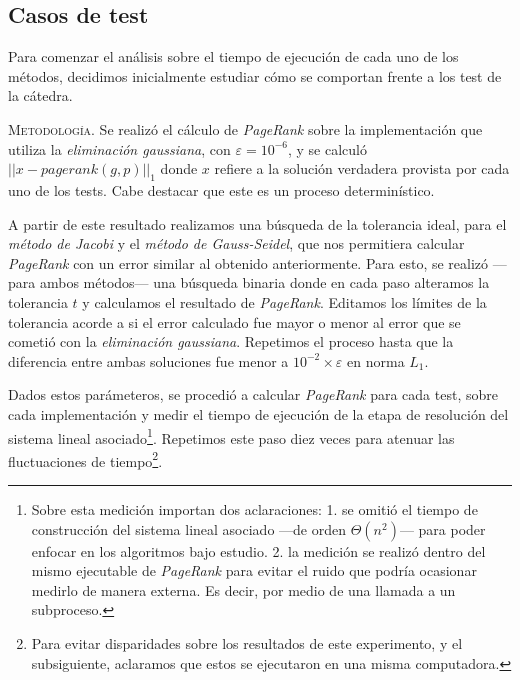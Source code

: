 \subsection{Casos de test}

Para comenzar el análisis sobre el tiempo de ejecución de cada uno de los métodos, decidimos inicialmente estudiar cómo se comportan frente a los test de la cátedra. %

\vspace{1em}
\noindent\textsc{Metodología}. Se realizó el cálculo de \textit{PageRank} sobre la implementación que utiliza la \textit{eliminación gaussiana}, con $\varepsilon = 10^{-6}$, y se calculó $||x - pagerank(g, p)||_1$ donde $x$ refiere a la solución verdadera provista por cada uno de los tests. Cabe destacar que este es un proceso determinístico. 

A partir de este resultado realizamos una búsqueda de la tolerancia ideal, para el \textit{método de Jacobi} y el \textit{método de Gauss-Seidel}, que nos permitiera calcular \textit{PageRank} con un error similar al obtenido anteriormente. Para esto, se realizó ---para ambos métodos--- una búsqueda binaria donde en cada paso alteramos la tolerancia $t$ y calculamos el resultado de \textit{PageRank}. Editamos los límites de la tolerancia acorde a si el error calculado fue mayor o menor al error que se cometió con la \textit{eliminación gaussiana}. Repetimos el proceso hasta que la diferencia entre ambas soluciones fue menor a $10^{-2} \times \varepsilon$ en norma $L_1$. %


Dados estos parámeteros, se procedió a calcular \textit{PageRank} para cada test, sobre cada implementación y medir el tiempo de ejecución de la etapa de resolución del sistema lineal asociado\footnote{Sobre esta medición importan dos aclaraciones: 1. se omitió el tiempo de construcción del sistema lineal asociado ---de orden $\Theta(n^2)$--- para poder enfocar en los algoritmos bajo estudio. 2. la medición se realizó dentro del mismo ejecutable de \textit{PageRank} para evitar el ruido que podría ocasionar medirlo de manera externa. Es decir, por medio de una llamada a un subproceso.}. Repetimos este paso diez veces para atenuar las fluctuaciones de tiempo\footnote{Para evitar disparidades sobre los resultados de este experimento, y el subsiguiente, aclaramos que estos se ejecutaron en una misma computadora.}. 

